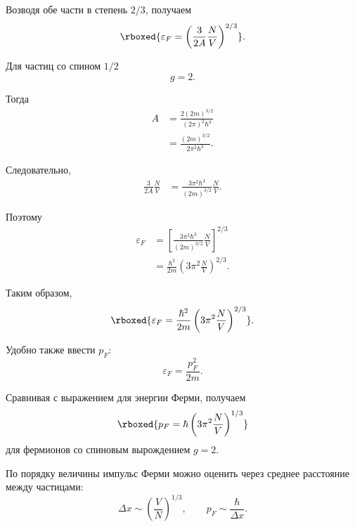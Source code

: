 \documentclass[../final.tex]{subfiles}
\begin{document}
Возводя обе части в степень $2/3$, получаем
%
\[
    \rboxed{
        \varepsilon_F
        =
        \left(
            \frac{3}{2A}
            \frac{N}{V}
        \right)^{2/3}
    }.
\]

Для частиц со спином $1/2$
%
\begin{equation*}
    g
    =
    2.
\end{equation*}

Тогда
%
\begin{align*}
    A
    &=
    \frac{
        2(2m)^{3/2}
    }{
        (2\pi)^2\hbar^3
    }
    \\[4pt]
    &=
    \frac{
        (2m)^{3/2}
    }{
        2\pi^2\hbar^3
    }.
\end{align*}

Следовательно,
%
\begin{align*}
    \frac{3}{2A}
    \frac{N}{V}
    &=
    \frac{
        3\pi^2\hbar^3
    }{
        (2m)^{3/2}
    }
    \frac{N}{V}.
\end{align*}

Поэтому
%
\begin{align*}
    \varepsilon_F
    &=
    \left[
        \frac{
            3\pi^2\hbar^3
        }{
            (2m)^{3/2}
        }
        \frac{N}{V}
    \right]^{2/3}
    \\[6pt]
    &=
    \frac{\hbar^2}{2m}
    \left(
        3\pi^2
        \frac{N}{V}
    \right)^{2/3}.
\end{align*}

Таким образом,
%
\[
    \rboxed{
        \varepsilon_F
        =
        \frac{\hbar^2}{2m}
        \left(
            3\pi^2
            \frac{N}{V}
        \right)^{2/3}
    }.
\]

Удобно также ввести  $p_F$:
%
\begin{equation*}
    \varepsilon_F
    =
    \frac{p_F^2}{2m}.
\end{equation*}

Сравнивая с выражением для энергии Ферми, получаем
%
\[
    \rboxed{
        p_F
        =
        \hbar
        \left(
            3\pi^2
            \frac{N}{V}
        \right)^{1/3}
    }
\]
%
для фермионов со спиновым вырождением $g=2$.

По порядку величины импульс Ферми можно оценить через среднее
расстояние между частицами:
%
\begin{equation*}
    \Delta x \sim \left(\frac{V}{N}\right)^{1/3},
    \qquad
    p_F \sim \frac{\hbar}{\Delta x}.
\end{equation*}
\end{document}
